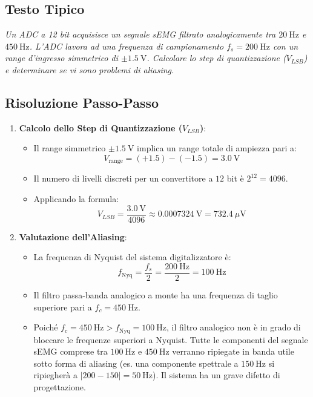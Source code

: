 \documentclass[10pt, letterpaper]{report}
\begin{document}
\subsection*{Testo Tipico}
\emph{Un ADC a 12 bit acquisisce un segnale sEMG filtrato analogicamente tra $20\ \text{Hz}$ e $450\ \text{Hz}$.
L'ADC lavora ad una frequenza di campionamento $f_s = 200\ \text{Hz}$ con un range d'ingresso simmetrico di $\pm 1.5\ \text{V}$.
Calcolare lo step di quantizzazione ($V_{LSB}$) e determinare se vi sono problemi di aliasing.}

\subsection*{Risoluzione Passo-Passo}
\begin{enumerate}
    \item \textbf{Calcolo dello Step di Quantizzazione ($V_{LSB}$)}:
    \begin{itemize}
        \item Il range simmetrico $\pm 1.5\ \text{V}$ implica un range totale di ampiezza pari a:
        \[
        V_{\text{range}} = (+1.5) - (-1.5) = 3.0\ \text{V}
        \]
        \item Il numero di livelli discreti per un convertitore a $12$ bit è $2^{12} = 4096$.
        \item Applicando la formula:
        \[
        V_{LSB} = \frac{3.0\ \text{V}}{4096} \approx 0.0007324\ \text{V} = 732.4\ \mu\text{V}
        \]
    \end{itemize}
    \item \textbf{Valutazione dell'Aliasing}:
    \begin{itemize}
        \item La frequenza di Nyquist del sistema digitalizzatore è:
        \[
        f_{\text{Nyq}} = \frac{f_s}{2} = \frac{200\ \text{Hz}}{2} = 100\ \text{Hz}
        \]
        \item Il filtro passa-banda analogico a monte ha una frequenza di taglio superiore pari a $f_c = 450\ \text{Hz}$.
        \item Poiché $f_c = 450\ \text{Hz} > f_{\text{Nyq}} = 100\ \text{Hz}$, il filtro analogico non è in grado di bloccare le frequenze superiori a Nyquist.
        Tutte le componenti del segnale sEMG comprese tra $100\ \text{Hz}$ e $450\ \text{Hz}$ verranno ripiegate in banda utile sotto forma di aliasing (es. una componente spettrale a $150\ \text{Hz}$ si ripiegherà a $|200 - 150| = 50\ \text{Hz}$).
        Il sistema ha un grave difetto di progettazione.
    \end{itemize}
\end{enumerate}
\end{document}
